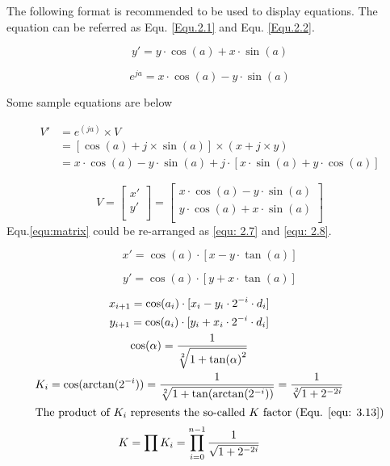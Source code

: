 The following format is recommended to be used to display equations. The equation can be referred as Equ. \ref{Equ.2.1} and Equ. \ref{Equ.2.2}. 


\begin{equation} \label{Equ.2.1}
y'=y\cdot\cos{(a)}+x\cdot\sin{(a)}
\end{equation}

\begin{equation} \label{Equ.2.2}
e^{ja}=x\cdot\cos{(a)}-y\cdot\sin{(a)}
\end{equation}

Some sample equations are below


\begin{align}
V' &=e^{(ja)}\times V \label{Equ.3.3}\\
&=[\cos(a) + j \times \sin(a)] \times (x+j \times y) \label{Equ.3.4}\\
&=x \cdot \cos(a) - y\cdot \sin(a) + j \cdot [x \cdot \sin(a) + y \cdot     \cos(a)] \label{Equ.3.5}
\end{align}


\begin{equation}
\label{equ:matrix}
V=
\begin{bmatrix}
x'\\
y'\\
\end{bmatrix}=
\begin{bmatrix}
x \cdot \cos(a) - y \cdot \sin(a)\\
y \cdot \cos(a) + x \cdot \sin(a)\\
\end{bmatrix}
\end{equation}
Equ.\ref{equ:matrix} could be re-arranged as \ref{equ: 2.7} and  \ref{equ: 2.8}.

\begin{equation} 
\label{equ: 2.7}
x'=\cos(a) \cdot[x-y\cdot\tan(a)]
\end{equation}

\begin{equation} 
\label{equ: 2.8}
y'=\cos(a) \cdot [y+x \cdot \tan(a)]
\end{equation}



\begin{gather} 
x_{i+1}=\cos(a_i) \cdot [x_i-y_i \cdot 2^{-i} \cdot d_i] \label{Equ. 3.9}\\
y_{i+1}=\cos(a_i) \cdot [y_i+x_i \cdot 2^{-i} \cdot d_i] \label{Equ. 3.10}\\
\cos(\alpha)=\dfrac{1}{\sqrt [2]{1+{\tan(\alpha)}^2}}
 \label{Equ. 3.11} \\
K_i=\cos(\arctan(2^{-i}))= \dfrac{1}{\sqrt [2]{1+\tan(\arctan(2^{-   i}))}}=\dfrac{1}{\sqrt[2]{1+2^{-2i}}}
\label{Equ. 3.12}\\
\intertext{The product of $K_i$  represents the so-called $K$ factor (Equ. \ref{equ: 3.13})}
K=\prod K_i=\prod_{i=0}^{n-1} \dfrac{1}{\sqrt{1+2^{-2i}}}
\label{equ: 3.13}
\end{gather}


